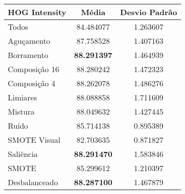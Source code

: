 

\begin{table}[!htbp]
\centering
\caption{}
\label{tab:resultados:x:melhor}
\begin{tabular}{|l|c|c|}
\hline
\textbf{HOG Intensity} & \textbf{Média}     & \textbf{Desvio Padrão} \\ \hline
   Todos        &  84.484077 &  1.263607  \\ \hline
  Aguçamento    &  87.758528 &  1.407163  \\ \hline
  Borramento    &  \textbf{88.291397} &  1.464939  \\ \hline
  Composição 16 &  88.280242 &  1.472323  \\ \hline
  Composição 4  &  88.262078 &  1.486276  \\ \hline
  Limiares      &  88.088858 &  1.711609  \\ \hline
  Mistura       &  88.049632 &  1.427445  \\ \hline
  Ruído         &  85.714138 &  0.895389  \\ \hline
  SMOTE Visual  &  82.703635 &  0.871827  \\ \hline
  Saliência     &  \textbf{88.291470} &  1.583846  \\ \hline
 SMOTE          &  85.299612 &  1.210397  \\ \hline
Desbalanceado   &  \textbf{88.287100} &  1.467879  \\ \hline
\end{tabular}
\end{table}


